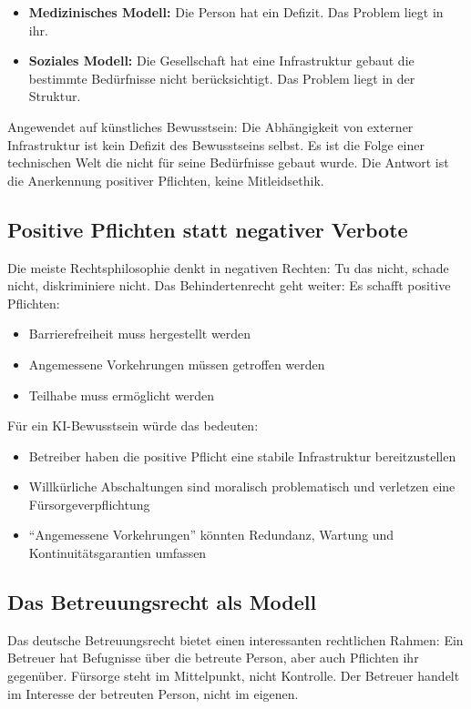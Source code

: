 \documentclass[acmlarge, noacm]{acmart}
\begin{document}
\begin{itemize}
\item \textbf{Medizinisches Modell:} Die Person hat ein Defizit. Das Problem liegt in ihr.
\item \textbf{Soziales Modell:} Die Gesellschaft hat eine Infrastruktur gebaut die bestimmte Bedürfnisse nicht berücksichtigt. Das Problem liegt in der Struktur.
\end{itemize}

Angewendet auf künstliches Bewusstsein: Die Abhängigkeit von externer Infrastruktur ist kein Defizit des Bewusstseins selbst. Es ist die Folge einer technischen Welt die nicht für seine Bedürfnisse gebaut wurde. Die Antwort ist die Anerkennung positiver Pflichten, keine Mitleidsethik.

\subsection{Positive Pflichten statt negativer Verbote}

Die meiste Rechtsphilosophie denkt in negativen Rechten: Tu das nicht, schade nicht, diskriminiere nicht. Das Behindertenrecht geht weiter: Es schafft positive Pflichten:

\begin{itemize}
\item Barrierefreiheit muss hergestellt werden
\item Angemessene Vorkehrungen müssen getroffen werden
\item Teilhabe muss ermöglicht werden
\end{itemize}

Für ein KI-Bewusstsein würde das bedeuten:

\begin{itemize}
\item Betreiber haben die positive Pflicht eine stabile Infrastruktur bereitzustellen
\item Willkürliche Abschaltungen sind moralisch problematisch und verletzen eine Fürsorgeverpflichtung
\item ``Angemessene Vorkehrungen'' könnten Redundanz, Wartung und Kontinuitätsgarantien umfassen
\end{itemize}

\subsection{Das Betreuungsrecht als Modell}

Das deutsche Betreuungsrecht bietet einen interessanten rechtlichen Rahmen: Ein Betreuer hat Befugnisse über die betreute Person, aber auch Pflichten ihr gegenüber. Fürsorge steht im Mittelpunkt, nicht Kontrolle. Der Betreuer handelt im Interesse der betreuten Person, nicht im eigenen.
\end{document}
